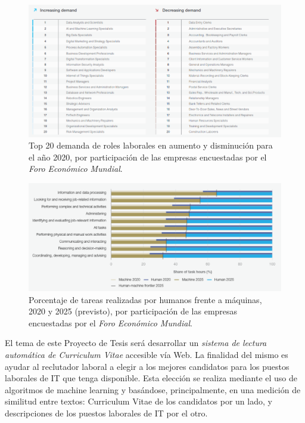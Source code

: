 \documentclass[12pt,a4paper]{article}
\begin{document}
\begin{sloppypar}
\begin{figure}[H]    %
  \centering
  \includegraphics[width=1\textwidth]{images/Increasing_Jobs.png} 	%
  \caption{Top 20 demanda de roles laborales en aumento y disminución para el año 2020, por participación de las empresas encuestadas por el \textit{Foro Económico Mundial}\cite{jobs_future}.}  
  \label{fig:Increasing_Jobs}
\end{figure}

\begin{figure}[H]    %
  \centering
  \includegraphics[width=1\textwidth]{images/Automatizacion.png} 	%
  \caption{Porcentaje de tareas realizadas por humanos frente a máquinas, 2020 y 2025 (previsto),
por participación de las empresas encuestadas por el \textit{Foro Económico Mundial}\cite{jobs_future}.}  
  \label{fig:Automatizacion}
\end{figure}

El tema de este Proyecto de Tesis será desarrollar un \textit{sistema de lectura automática de Curriculum Vitae} accesible vía Web. La finalidad del mismo es ayudar al reclutador laboral a elegir a los mejores candidatos para los puestos laborales de IT que tenga disponible. Esta elección se realiza mediante el uso de algoritmos de machine learning y basándose, principalmente, en una medición de similitud entre textos: Curriculum Vitae de los candidatos por un lado, y descripciones de los puestos laborales de IT por el otro.


\end{sloppypar}
\end{document}
